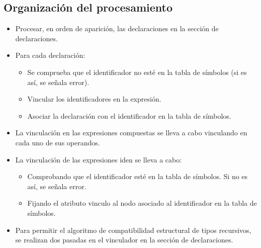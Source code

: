 \documentclass[11pt]{article}
\begin{document}
        \subsection{Organización del procesamiento}
            \begin{itemize}
                \item Procesar, en orden de aparición, las declaraciones en la sección de declaraciones.
                \item Para cada declaración:
                    \begin{itemize}
                        \item Se comprueba que el identificador no esté en la tabla de símbolos (si es así, se señala error).
                        \item Vincular los identificadores en la expresión.
                        \item Asociar la declaración con el identificador en la tabla de símbolos.
                    \end{itemize}
                \item La vinculación en las expresiones compuestas se lleva a cabo vinculando en cada uno de sus operandos.
                \item La vinculación de las expresiones iden se lleva a cabo:
                    \begin{itemize}
                        \item Comprobando que el identificador esté en la tabla de símbolos. Si no es así, se señala error.
                        \item Fijando el atributo vinculo al nodo asociado al identificador en la tabla de símbolos.
                    \end{itemize}
                \item Para permitir el algoritmo de compatibilidad estructural de tipos recursivos, se realizan dos pasadas en el vinculador en la sección de declaraciones.
            \end{itemize}
\end{document}
